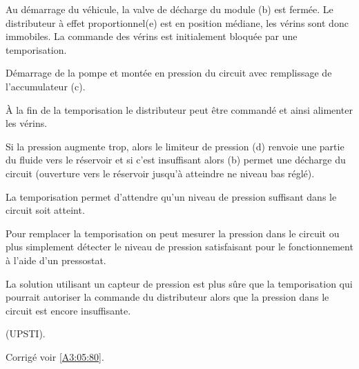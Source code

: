 Au démarrage du véhicule, la valve de décharge du module (b) est fermée. Le distributeur à effet proportionnel(e) est en position médiane, les vérins sont donc immobiles. La commande des vérins est initialement bloquée par une temporisation.

\ifprof
\begin{corrige}
Démarrage de la pompe et montée en pression du circuit avec remplissage de l’accumulateur (c).

À la fin de la temporisation le distributeur peut être commandé et ainsi alimenter les vérins.

Si la pression augmente trop, alors le limiteur de pression (d) renvoie une partie du fluide vers le
réservoir et si c’est insuffisant alors (b) permet une décharge du circuit (ouverture vers le réservoir
jusqu’à atteindre ne niveau bas réglé).

La temporisation permet d’attendre qu’un niveau de pression suffisant dans le circuit soit atteint.

Pour remplacer la temporisation on peut mesurer la pression dans le circuit ou plus simplement détecter
le niveau de pression satisfaisant pour le fonctionnement à l’aide d’un pressostat.

La solution utilisant un capteur de pression est plus sûre que la temporisation qui pourrait autoriser la
commande du distributeur alors que la pression dans le circuit est encore insuffisante.

(UPSTI). 
\end{corrige}
\else
\fi






\ifprof
\else
\begin{flushright}
\footnotesize{Corrigé  voir \ref{A3:05:80}.}
\end{flushright}%
\fi